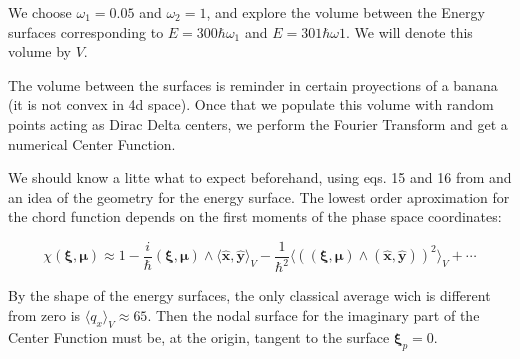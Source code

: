 \documentclass[a4paper,12pt]{article}
\newcommand{\ihb}{\frac{i}{\hbar}}
\newcommand{\xfase}{\mathbf{x}}
\newcommand{\yfase}{\mathbf{y}}
\newcommand{\xifase}{ {\boldsymbol{\xi}} }
\newcommand{\mufase}{ {\boldsymbol{\mu}} }
\newcommand{\Prom}[2]{\langle #1\rangle_{#2}}
\begin{document}
We choose $\omega_1=0.05$ and $\omega_2=1$, and explore the volume
between the Energy surfaces corresponding to $E=300\hbar\omega_1$ 
and $E=301\hbar\omega1$. We will denote this volume by $V$.
 

The volume between the surfaces is reminder in certain proyections
of a banana (it is not convex in 4d space). Once that we populate
this volume with random points acting as Dirac Delta centers, we
perform the Fourier Transform and get a numerical Center Function. 

We should know a litte what to expect beforehand, using eqs. 15 and 16
from  \cite{Zambrano10} and an idea of the geometry for the
energy surface. The lowest order aproximation for the 
chord function depends on the first moments of the phase space
coordinates:

\begin{equation}
\chi(\xifase,\mufase)\approx 
1-\ihb (\xifase,\mufase) \wedge \Prom{\hat{\xfase},\hat{\yfase}}{V}
-\frac{1}{\hbar^2}
\Prom{((\xifase,\mufase)\wedge(\hat{\xfase},\hat{\yfase}))^2}{V}+\cdots
\end{equation}


By the shape of the energy surfaces, the only classical
average wich  is different from zero is $\Prom{q_x}{V}\approx 65$.
Then the nodal surface for the imaginary part of the Center Function
must be, at the origin, tangent to the surface $\xifase_p=0$.



\end{document}
